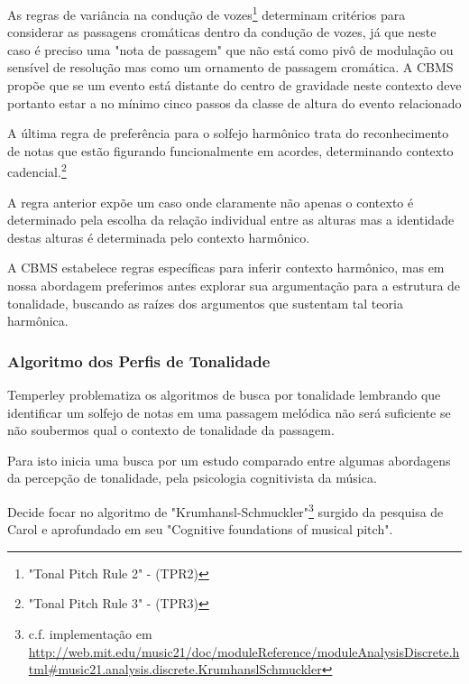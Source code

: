 \documentclass[
	12pt,				%
	openright,			%
	twoside,			%
	a4paper,			%
	english,			%
	french,				%
	spanish,			%
	brazil				%
	]{abntex2}
\begin{document}
As regras de variância na condução de vozes\footnote{"Tonal Pitch Rule 2" - (TPR2)\cite[ p.129]{temperley2001cognition}} determinam critérios para considerar as passagens cromáticas dentro da condução de vozes, já que neste caso é preciso uma "nota de passagem" que não está como pivô de modulação ou sensível de resolução mas como um ornamento de passagem cromática. A CBMS propõe que se um evento está distante do centro de gravidade neste contexto deve portanto estar a no mínimo cinco passos da classe de altura do evento relacionado\cite[ p.130]{temperley1997algorithm}

A última regra de preferência para o solfejo harmônico trata do reconhecimento de notas que estão figurando funcionalmente em acordes, determinando contexto cadencial.\footnote{"Tonal Pitch Rule 3" - (TPR3)\cite[ p.131]{temperley2001cognition}}

A regra anterior expõe um caso onde claramente não apenas o contexto é determinado pela escolha da relação individual entre as alturas  mas a identidade destas alturas é determinada pelo contexto harmônico. 

A CBMS estabelece regras específicas para inferir contexto harmônico, mas em nossa abordagem preferimos antes explorar sua argumentação para a estrutura de tonalidade, buscando as raízes dos argumentos que sustentam tal teoria harmônica. 


\pagebreak
\subsubsection{Algoritmo dos Perfis de Tonalidade}
\label{perfiltonal}

Temperley problematiza os algoritmos de busca por tonalidade lembrando que identificar um solfejo de notas em uma passagem melódica não será suficiente se não soubermos qual o contexto de tonalidade da passagem\cite[p.167]{temperley2001cognition}.

Para isto inicia uma busca por um estudo comparado entre algumas abordagens da percepção de tonalidade, pela psicologia cognitivista da música. \cite{cuddy1979melody,brown1994musical,deutsch1981internal,longuet1971interpreting}

Decide focar no algoritmo de "Krumhansl-Schmuckler"\footnote{c.f. implementação em \url{http://web.mit.edu/music21/doc/moduleReference/moduleAnalysisDiscrete.html\#music21.analysis.discrete.KrumhanslSchmuckler}} 
surgido da pesquisa de Carol  e aprofundado em seu "Cognitive foundations of musical pitch"\cite{krumhansl1990cognitive}.
\end{document}
